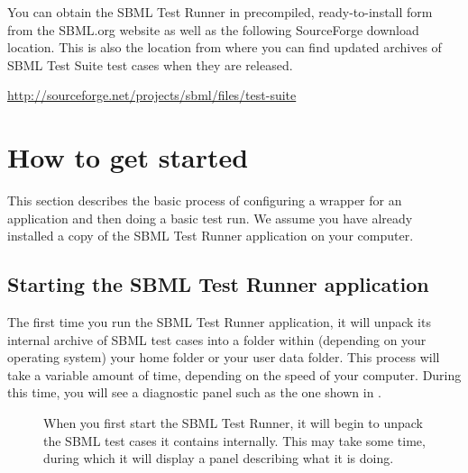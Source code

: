 \documentclass{sbmlpkgspec}
\begin{document}
You can obtain the SBML Test Runner in precompiled, ready-to-install form from the SBML.org website as well as the following SourceForge download location.  This is also the location from where you can find updated archives of SBML Test Suite test cases when they are released.

\begin{center}
\url{http://sourceforge.net/projects/sbml/files/test-suite}
\end{center}


\section{How to get started}

This section describes the basic process of configuring a wrapper for an application and then doing a basic test run.  We assume you have already  installed a copy of the SBML Test Runner application on your computer.


\subsection{Starting the SBML Test Runner application}

The first time you run the SBML Test Runner application, it will unpack its internal archive of SBML test cases into a folder within (depending on your operating system) your home folder or your user data folder.  This process will take a variable amount of time, depending on the speed of your computer.  During this time, you will see a diagnostic panel such as the one shown in .

\setlength{\fboxsep}{0pt}

\begin{figure}[hb]
  \caption{When you first start the SBML Test Runner, it will begin to unpack the SBML test cases it contains internally.  This may take some time, during which it will display a panel describing what it is doing.}
  \label{first-time}
\end{figure}
\end{document}

